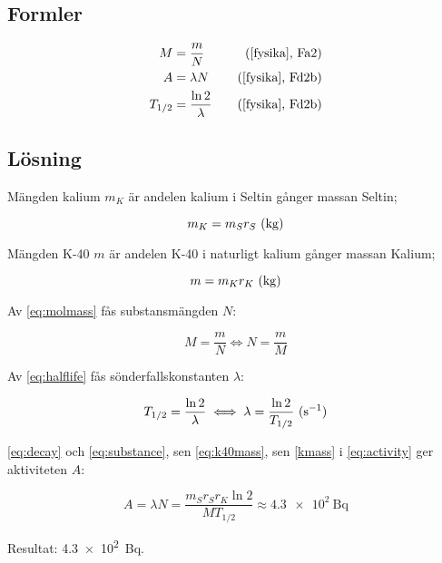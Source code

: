 \subsection{Formler}

\begin{align}
    M       &= \frac{m}{N}           &\quad \text{(\cite{fysika}, Fa2)}  \label{eq:molmass} \\
    A       &= \lambda N             &\quad \text{(\cite{fysika}, Fd2b)} \label{eq:activity}  \\
    T_{1/2} &= \frac{\ln 2}{\lambda} &\quad \text{(\cite{fysika}, Fd2b)} \label{eq:halflife}
\end{align}

\subsection{Lösning}

Mängden kalium $m_K$ är andelen kalium i Seltin gånger massan Seltin;

\begin{equation}
    m_K = m_S r_S~\text{(\unit{\kg})} \label{eq:kmass}
\end{equation}

Mängden K-40 $m$ är andelen K-40 i naturligt kalium gånger massan Kalium;

\begin{equation}
    m = m_K r_K~\text{(\unit{\kg})} \label{eq:k40mass}
\end{equation}

Av \eqref{eq:molmass} fås substansmängden $N$:

\begin{equation}
    M = \frac{m}{N} \iff N = \frac{m}{M} \label{eq:substance}
\end{equation}

Av \eqref{eq:halflife} fås sönderfallskonstanten $\lambda$:

\begin{equation}
    T_{1/2} = \frac{\ln 2}{\lambda} \iff \lambda = \frac{\ln 2}{T_{1/2}}~\text{(\unit{\per\s})} \label{eq:decay}
\end{equation}

\eqref{eq:decay} och \eqref{eq:substance}, sen \eqref{eq:k40mass}, sen
\eqref{kmass} i \eqref{eq:activity} ger aktiviteten $A$:

\begin{equation}
    A = \lambda N = \frac{m_S r_S r_K \ln 2}{M T_{1/2}} \approx \qty{4.3e2}{\becquerel}
\end{equation}

Resultat: \qty{4.3e2}{\becquerel}.
